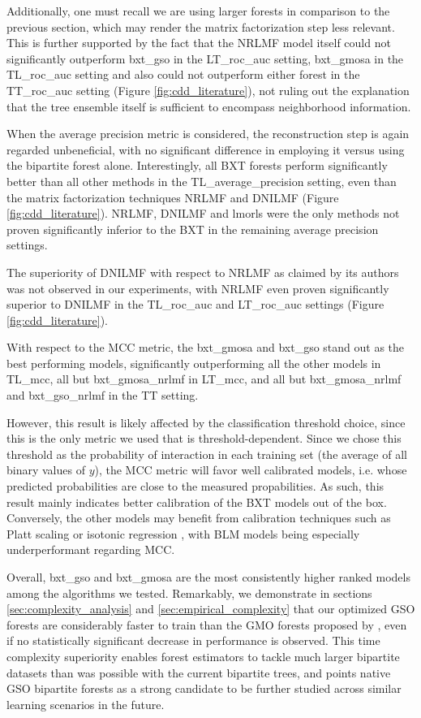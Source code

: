 \documentclass[conference]{IEEEtran}
\begin{document}
Additionally, one must recall we are using larger forests in comparison to the previous section, which may render the matrix factorization step less relevant.
This is further supported by the fact that the NRLMF model itself could not significantly outperform bxt\_gso in the LT\_roc\_auc setting, bxt\_gmosa in the TL\_roc\_auc setting and also could not outperform either forest in the TT\_roc\_auc setting (Figure \ref{fig:cdd_literature}), not ruling out the explanation that the tree ensemble itself is sufficient to encompass neighborhood information.

When the average precision metric is considered, the reconstruction step is again regarded unbeneficial, with no significant difference in employing it versus using the bipartite forest alone. Interestingly, all BXT forests perform significantly better than all other methods in the TL\_average\_precision setting, even than the matrix factorization techniques NRLMF and DNILMF (Figure \ref{fig:cdd_literature}). NRLMF, DNILMF and lmorls were the only methods not proven significantly inferior to the BXT in the remaining average precision settings. 

The superiority of DNILMF with respect to NRLMF as claimed by its authors \cite{} was not observed in our experiments, with NRLMF even proven significantly superior to DNILMF in the TL\_roc\_auc and LT\_roc\_auc settings (Figure \ref{fig:cdd_literature}).

With respect to the MCC metric, the bxt\_gmosa and bxt\_gso stand out as the best performing models, significantly outperforming all the other models in TL\_mcc, all but bxt\_gmosa\_nrlmf in LT\_mcc, and all but bxt\_gmosa\_nrlmf and bxt\_gso\_nrlmf in the TT setting.

However, this result is likely affected by the classification threshold choice, since this is the only metric we used that is threshold-dependent. Since we chose this threshold as the probability of interaction in each training set (the average of all binary values of $y$), the MCC metric will favor well calibrated models, i.e. whose predicted probabilities are close to the measured propabilities.  %
As such, this result mainly indicates better calibration of the BXT models out of the box. Conversely, the other models may benefit from calibration techniques such as Platt scaling \cite{} or isotonic regression \cite{}, with BLM models being especially underperformant regarding MCC.

Overall, bxt\_gso and bxt\_gmosa are the most consistently higher ranked models among the algorithms we tested. Remarkably, we demonstrate in sections \ref{sec:complexity_analysis} and \ref{sec:empirical_complexity} that our optimized GSO forests are considerably faster to train than the GMO forests proposed by \cite{Pliakos_2018}, even if no statistically significant decrease in performance is observed. This time complexity superiority enables forest estimators to tackle much larger bipartite datasets than was possible with the current bipartite trees, and points native GSO bipartite forests as a strong candidate to be further studied across similar learning scenarios in the future.
\end{document}
